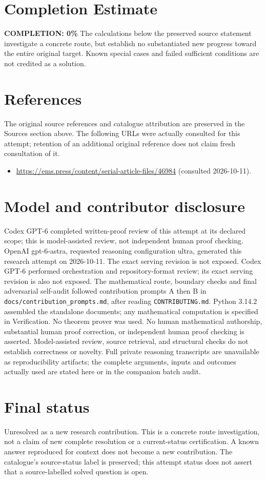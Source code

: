 \documentclass[11pt]{article}
\begin{document}
\section{Completion Estimate}
\noindent\textbf{COMPLETION: 0\%}
The calculations below the preserved source statement investigate a concrete route,
but establish no substantiated new progress toward the entire original target.
Known special cases and failed sufficient conditions are not credited as a solution.
\section{References}
The original source references and catalogue attribution are preserved in the
Sources section above. The following URLs were actually consulted for this attempt;
retention of an additional original reference does not claim fresh consultation of it.
\begin{itemize}
\item \url{https://ems.press/content/serial-article-files/46984} (consulted 2026-10-11). 
\end{itemize}
\section{Model and contributor disclosure}
Codex GPT-6 completed written-proof review of this attempt at its declared scope; this is model-assisted review, not independent human proof checking.
OpenAI gpt-6-astra, requested reasoning configuration ultra, generated this research
attempt on 2026-10-11. The exact serving revision is not exposed. Codex GPT-6
performed orchestration and repository-format review; its exact serving revision
is also not exposed. The mathematical route, boundary checks and final adversarial
self-audit followed contribution prompts A then B in
\texttt{docs/contribution\_prompts.md}, after reading \texttt{CONTRIBUTING.md}.
Python 3.14.2 assembled the standalone documents; any mathematical computation is
specified in Verification. No theorem prover was used. No human mathematical
authorship, substantial human proof correction, or independent human proof checking
is asserted. Model-assisted review, source retrieval, and structural checks do not
establish correctness or novelty. Full private reasoning transcripts are unavailable
as reproducibility artifacts; the complete arguments, inputs and outcomes actually
used are stated here or in the companion batch audit.
\section{Final status}
Unresolved as a new research contribution. This is a concrete route investigation,
not a claim of new complete resolution or a current-status certification. A known
answer reproduced for context does not become a new contribution. The catalogue's
source-status label is preserved; this attempt status does not assert that a
source-labelled solved question is open.
\end{document}
